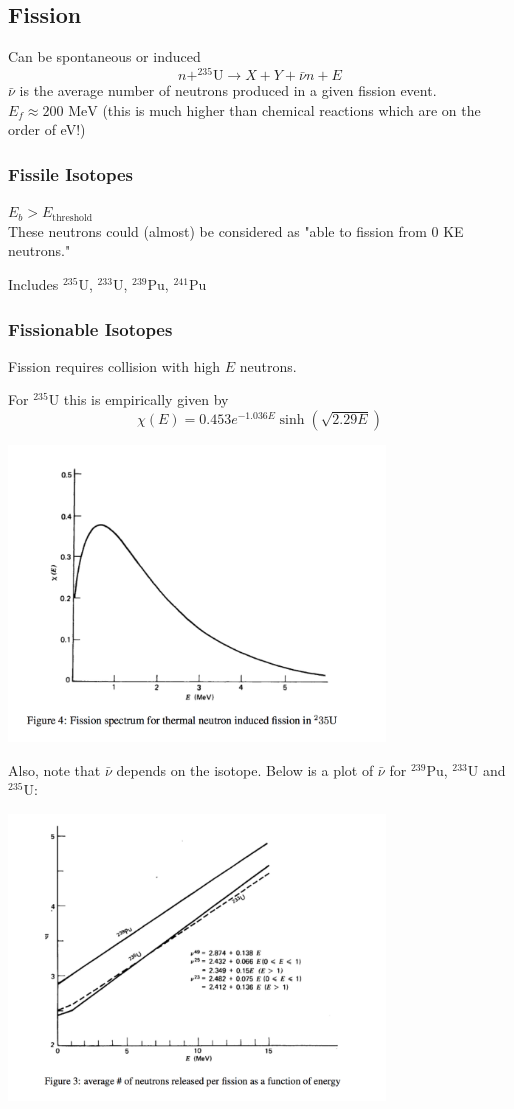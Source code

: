 \documentclass{report}
\newcommand{\hh}[1]{\subsection*{#1}}
\newcommand{\hhh}[1]{\subsubsection*{#1}}
\newcommand{\uthree}{^{233}\text{U}}
\newcommand{\ufive}{^{235}\text{U}}
\newcommand{\punine}{^{239}\text{Pu}}
\newcommand{\puone}{^{241}\text{Pu}}
\begin{document}
\hh{Fission}

Can be spontaneous or induced\\
$$ n + \ufive \rightarrow X + Y + \bar{\nu} n + E $$
$\bar{\nu}$ is the average number of neutrons produced in a given fission event.\\
$ E_f \approx 200 \text{ MeV} $ (this is much higher than chemical reactions which are on the order of eV!)

\hhh{Fissile Isotopes}
$ E_b > E_{\text{threshold}}$\\

These neutrons could (almost) be considered as "able to fission from 0 KE neutrons."

Includes $\ufive$, $\uthree$, $\punine$, $\puone$

\hhh{Fissionable Isotopes}

Fission requires collision with high $E$ neutrons.

For $\ufive$ this is empirically given by $$\chi(E) = 0.453e^{-1.036E}\sinh(\sqrt{2.29E})$$

\includegraphics[width=10cm]{Lecture02_FissionEDist}


Also, note that $\bar{\nu}$ depends on the isotope. Below is a plot of $\bar{\nu}$ for $\punine$, $\uthree$ and $\ufive$:

\includegraphics[width=10cm]{Lecture02_nubarUPu}
\end{document}
